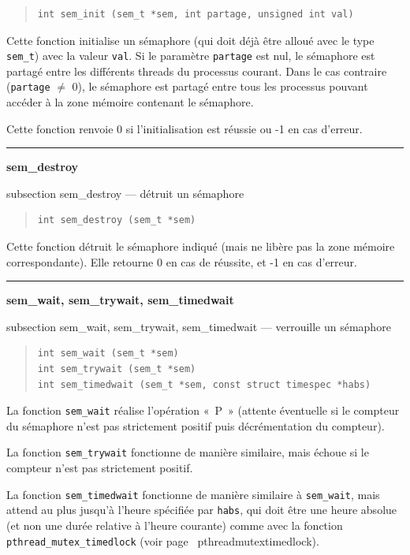 \documentclass [twoside] {report}
\newcommand {\primitive} [1]
    {
	\phantomsection
	{\large \textbf {#1}}
	\addcontentsline {toc} {subsection} {#1}
    }
\newcommand {\separation}
    {
	\vspace {5mm}
	\nopagebreak
	\hrule
    }
\begin{document}
\begin {quote}
\begin {verbatim}
int sem_init (sem_t *sem, int partage, unsigned int val)
\end{verbatim}
\end {quote}

Cette fonction initialise un sémaphore (qui doit déjà être alloué
avec le type \texttt {sem\_t}) avec la valeur \texttt {val}. Si le
paramètre \texttt {partage} est nul, le sémaphore est partagé entre les
différents threads du processus courant. Dans le cas contraire (\texttt
{partage} $\neq$ 0), le sémaphore est partagé entre tous les processus
pouvant accéder à la zone mémoire contenant le sémaphore.

Cette fonction renvoie 0 si l'initialisation est réussie
ou -1 en cas d'erreur.


\separation
\primitive {sem\_destroy} --- détruit un sémaphore

\begin {quote}
\begin {verbatim}
int sem_destroy (sem_t *sem)
\end{verbatim}
\end {quote}

Cette fonction détruit le sémaphore indiqué (mais ne libère pas
la zone mémoire correspondante). Elle retourne 0 en cas de réussite,
et -1 en cas d'erreur.


\separation
\primitive {sem\_wait, sem\_trywait, sem\_timedwait} --- verrouille un sémaphore

\begin {quote}
\begin {verbatim}
int sem_wait (sem_t *sem)
int sem_trywait (sem_t *sem)
int sem_timedwait (sem_t *sem, const struct timespec *habs)
\end{verbatim}
\end {quote}

La fonction \verb|sem_wait| réalise l'opération «~P~» (attente
éventuelle si le compteur du sémaphore n'est pas strictement positif
puis décrémentation du compteur).

La fonction \verb|sem_trywait| fonctionne de manière similaire,
mais échoue si le compteur n'est pas strictement positif.

La fonction \verb|sem_timedwait| fonctionne de manière similaire à
\verb|sem_wait|, mais attend au plus jusqu'à l'heure spécifiée par
\texttt {habs}, qui doit être une heure absolue (et non une durée
relative à l'heure courante) comme avec la fonction
\verb|pthread_mutex_timedlock| (voir page~\pageref
{pthreadmutextimedlock}).
\end{document}
